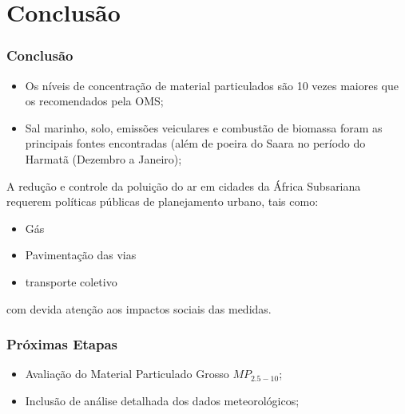 \section{Conclusão}

\begin{frame}
  \frametitle{Conclusão}
  \begin{itemize}
    \item Os níveis de concentração de material particulados são 10 vezes maiores que os recomendados pela OMS;
    \item Sal marinho, solo, emissões veiculares e combustão de biomassa foram as principais fontes encontradas (além de poeira do Saara no período do Harmatã (Dezembro a Janeiro);
  \end{itemize}
  A redução e controle da poluição do ar em cidades da África Subsariana requerem políticas públicas de planejamento urbano, tais como:

  \begin{itemize}
    \item Gás
    \item Pavimentação das vias
    \item transporte coletivo
  \end{itemize}
com devida atenção aos impactos sociais das medidas.
\end{frame}

\begin{frame}
  \frametitle{Próximas Etapas}
  \begin{itemize}
    \item Avaliação do Material Particulado Grosso $MP_{2.5-10}$;
    \item Inclusão de análise detalhada dos dados meteorológicos;
  \end{itemize}
\end{frame}
